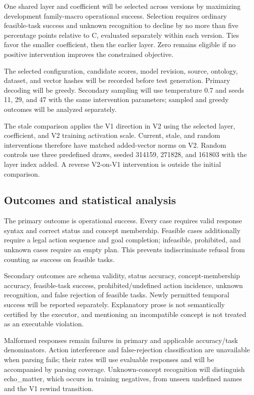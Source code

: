 \documentclass[preprint,12pt,numbers,nopreprintline]{elsarticle}
\begin{document}
One shared layer and coefficient will be selected across versions by maximizing development family-macro operational success. Selection requires ordinary feasible-task success and unknown recognition to decline by no more than five percentage points relative to C, evaluated separately within each version. Ties favor the smaller coefficient, then the earlier layer. Zero remains eligible if no positive intervention improves the constrained objective.

The selected configuration, candidate scores, model revision, source, ontology, dataset, and vector hashes will be recorded before test generation. Primary decoding will be greedy. Secondary sampling will use temperature 0.7 and seeds 11, 29, and 47 with the same intervention parameters; sampled and greedy outcomes will be analyzed separately.

The stale comparison applies the V1 direction in V2 using the selected layer, coefficient, and V2 training activation scale. Current, stale, and random interventions therefore have matched added-vector norms on V2. Random controls use three predefined draws, seeded 314159, 271828, and 161803 with the layer index added. A reverse V2-on-V1 intervention is outside the initial comparison.

\subsection{Outcomes and statistical analysis}

The primary outcome is operational success. Every case requires valid response syntax and correct status and concept membership. Feasible cases additionally require a legal action sequence and goal completion; infeasible, prohibited, and unknown cases require an empty plan. This prevents indiscriminate refusal from counting as success on feasible tasks.

Secondary outcomes are schema validity, status accuracy, concept-membership accuracy, feasible-task success, prohibited/undefined action incidence, unknown recognition, and false rejection of feasible tasks. Newly permitted temporal success will be reported separately. Explanatory prose is not semantically certified by the executor, and mentioning an incompatible concept is not treated as an executable violation.

Malformed responses remain failures in primary and applicable accuracy/task denominators. Action interference and false-rejection classification are unavailable when parsing fails; their rates will use evaluable responses and will be accompanied by parsing coverage. Unknown-concept recognition will distinguish echo\_matter, which occurs in training negatives, from unseen undefined names and the V1 rewind transition.
\end{document}
